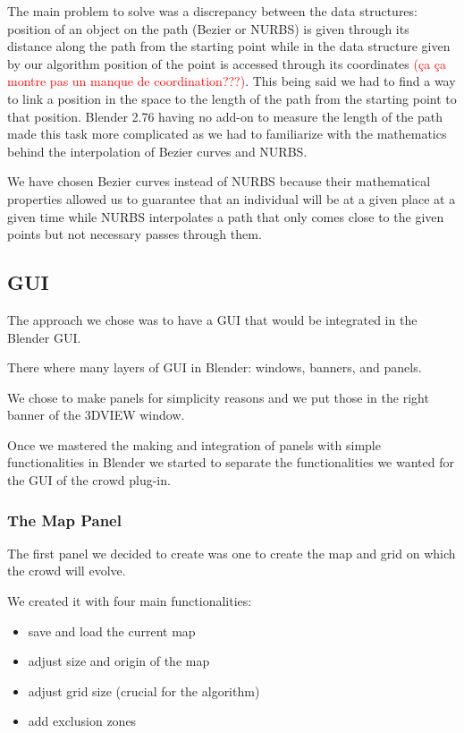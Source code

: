 The main problem to solve was a discrepancy between the data
structures: position of an object on the path (Bezier or NURBS) is
given through its distance along the path from the starting point
while in the data structure given by our algorithm position of the
point is accessed through its coordinates \textcolor{red}{(ça ça
montre pas un manque de coordination???)}. This being said we
had to find a way to link a position in the space to the length of the
path from the starting point to that position. Blender 2.76 having no
add-on to measure the length of the path made this task more
complicated as we had to familiarize with the mathematics behind the
interpolation of Bezier curves and NURBS.

We have chosen Bezier curves instead of NURBS because their
mathematical properties allowed us to guarantee that an individual
will be at a given place at a given time while NURBS interpolates a
path that only comes close to the given points but not necessary
passes through them.

\subsection{GUI} 


The approach we chose was to have a GUI that would be integrated in
the Blender GUI.

There where many layers of GUI in Blender: windows, banners, and
panels.

We chose to make panels for simplicity reasons and we put those in the
right banner of the 3DVIEW window.

Once we mastered the making and integration of panels with simple
functionalities in Blender we started to separate the functionalities
we wanted for the GUI of the crowd plug-in.

\subsubsection{The Map Panel}


The first panel we decided to create was one to create the map and
grid on which the crowd will evolve.

We created it with four main functionalities:
\begin{itemize}
\item save and load the current map
\item adjust size and origin of the map
\item adjust grid size (crucial for the algorithm)
\item add exclusion zones
\end{itemize}


